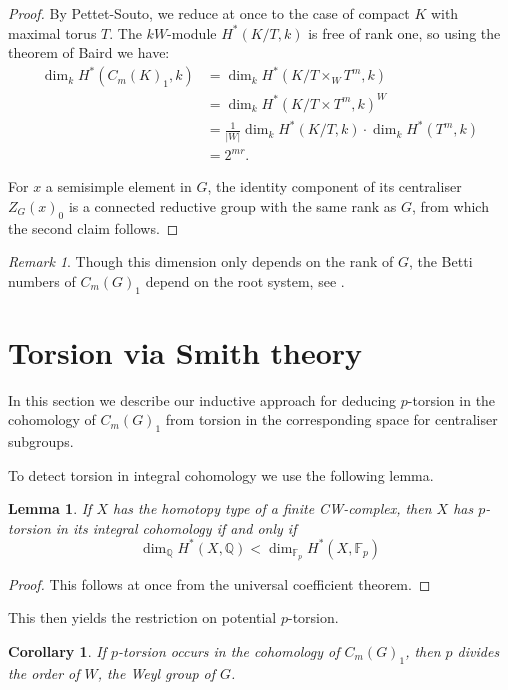 \documentclass[oneside, 12pt, a4paper]{amsart}
\numberwithin{equation}{section}
\theoremstyle{plain}
\newtheorem{lemma}[theorem]{Lemma}
\newtheorem{corollary}[theorem]{Corollary}
\theoremstyle{definition}
\theoremstyle{remark}
\newtheorem{remark}[theorem]{Remark}
\begin{document}
\begin{proof}
By Pettet-Souto, we reduce at once to the case of compact $K$ with maximal torus $T$. The $kW$-module $H^*(K/T,k)$ is free of rank one, so using the theorem of Baird we have: 
\begin{align*}
    \dim_k H^*(C_m(K)_1,k)&=
    \dim_k H^*(K/T\times_W T^m,k)\\&=\dim_k H^*(K/T\times T^m,k)^W\\
    &=\frac{1}{|W|}\dim_k H^*(K/T,k)\cdot \dim_k H^*(T^m,k)\\
    &=2^{mr}.
\end{align*}

For $x$ a semisimple element in $G$, the identity component of its centraliser $Z_G(x)_0$ is a connected reductive group with the same rank as $G$, from which the second claim follows.
\end{proof}

\begin{remark}
Though this dimension only depends on the rank of $G$, the Betti numbers of $C_m(G)_1$ depend on the root system, see \cite[Theorem 1.1]{RamrasStafa}.
\end{remark}

\section{Torsion via Smith theory}
In this section we describe our inductive approach for deducing $p$-torsion in the cohomology of $C_m(G)_1$ from torsion in the corresponding space for centraliser subgroups.

To detect torsion in integral cohomology we use the following lemma.

\begin{lemma} \label{lem:recognition}
If $X$ has the homotopy type of a finite CW-complex, then $X$ has $p$-torsion in its integral cohomology if and only if \[\dim_{\mathbb{Q}}H^*(X,\mathbb{Q})< \dim_{\mathbb{F}_p}H^*(X,\mathbb{F}_p)\]
\end{lemma}
\begin{proof}
This follows at once from the universal coefficient theorem.
\end{proof}

This then yields the restriction on potential $p$-torsion.

\begin{corollary} \label{cor:modular}
If $p$-torsion occurs in the cohomology of $C_m(G)_1$, then $p$ divides the order of $W$, the Weyl group of $G$.
\end{corollary}
\end{document}
